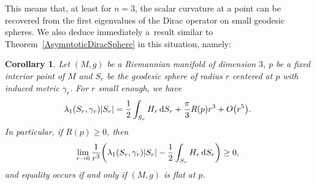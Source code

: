 \documentclass[pdftex]{sigma}
\numberwithin{equation}{section}
\newtheorem{Corollary}[Theorem]{Corollary}
\begin{document}
This means that, at least for $n=3$, the scalar curvature at a point can be recovered from the first eigenvalues of the Dirac operator on small geodesic spheres. We also deduce immediately a~result similar to Theorem~\ref{AsymptoticDiracSphere} in this situation, namely:

\begin{Corollary}\label{SmallSphereDiracV}
Let $(M,g)$ be a Riemannian manifold of dimension $3$, $p$ be a fixed interior point of $M$ and $S_r$ be the geodesic sphere of radius $r$ centered at $p$ with induced metric $\gamma_r$. For $r$ small enough, we have
\begin{gather*}%
\lambda_1(S_r,\gamma_r)|S_r|=\frac{1}{2}\int_{S_r} H_r\,{\rm d}S_{r}+\frac{\pi}{3}R(p)r^3+O\big(r^5\big).
\end{gather*}
In particular, if $R(p)\geq 0$, then
\begin{gather*}
\lim_{r\rightarrow 0}\frac{1}{r^3}\bigg(\lambda_1(S_r,\gamma_r)|S_r|-\frac{1}{2}\int_{S_r} H_r\,{\rm d}S_{r}\bigg)\geq 0,
\end{gather*}
and equality occurs if and only if $(M,g)$ is flat at $p$.
\end{Corollary}
\end{document}
